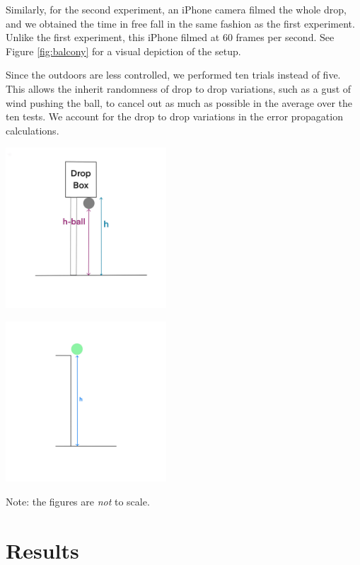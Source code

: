 \documentclass[12pt]{article}
\begin{document}
Similarly, for the second experiment, an iPhone camera filmed the whole drop, and we obtained the time in free fall in the same fashion as the first experiment. Unlike the first experiment, this iPhone filmed at 60 frames per second. See Figure \ref{fig:balcony} for a visual depiction of the setup.

Since the outdoors are less controlled, we performed ten trials instead of five. This allows the inherit randomness of drop to drop variations, such as a gust of wind pushing the ball, to cancel out as much as possible in the average over the ten tests. We account for the drop to drop variations in the error propagation calculations.

\begin{center}
\includegraphics[height=6cm]{./dropbox.jpg}
\end{center}

\begin{center}
\includegraphics[height=6cm]{./balcony.jpg}
\end{center}

Note: the figures are \emph{not} to scale.
\section{Results}
\label{sec:orgfd4685d}
\end{document}
